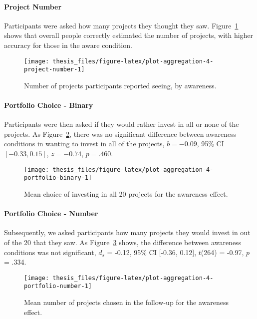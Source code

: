 \documentclass[a4paper, nobind]{templates/ociamthesis}
\theoremstyle{definition}
\theoremstyle{definition}
\theoremstyle{definition}
\theoremstyle{definition}
\theoremstyle{remark}
\begin{document}
\paragraph{Project Number}

Participants were asked how many projects they thought they saw.
Figure~\ref{fig:plot-aggregation-4-project-number} shows that overall people
correctly estimated the number of projects, with higher accuracy for those in the
aware condition.



\begin{figure}
\texttt{[image: thesis\_files/figure-latex/plot-aggregation-4-project-number-1]} \caption{Number of projects participants reported seeing, by awareness.}\label{fig:plot-aggregation-4-project-number}
\end{figure}

\paragraph{Portfolio Choice - Binary}

Participants were then asked if they would rather invest in all or none of the
projects. As Figure~\ref{fig:plot-aggregation-4-portfolio-binary}, there was no
significant difference between awareness conditions in wanting to invest
in all of the projects,
\(b = -0.09\), 95\% CI \([-0.33, 0.15]\), \(z = -0.74\), \(p = .460\).



\begin{figure}
\texttt{[image: thesis\_files/figure-latex/plot-aggregation-4-portfolio-binary-1]} \caption{Mean choice of investing in all 20 projects for the awareness effect.}\label{fig:plot-aggregation-4-portfolio-binary}
\end{figure}

\paragraph{Portfolio Choice - Number}

Subsequently, we asked participants how many projects they would invest in out
of the 20 that they saw. As
Figure~\ref{fig:plot-aggregation-4-portfolio-number} shows, the difference
between awareness conditions was not significant,
\(d_s\) = -0.12, 95\% CI {[}-0.36, 0.12{]}, \(t\)(264) = -0.97, \(p\) = .334.



\begin{figure}
\texttt{[image: thesis\_files/figure-latex/plot-aggregation-4-portfolio-number-1]} \caption{Mean number of projects chosen in the follow-up for the awareness effect.}\label{fig:plot-aggregation-4-portfolio-number}
\end{figure}
\end{document}
